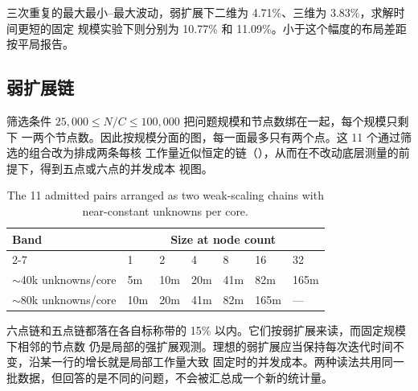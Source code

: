 \documentclass[11pt,a4paper,oneside]{report}
\let\OldSubsection\subsection
\renewcommand{\subsection}{\FloatBarrier\OldSubsection}
\begin{document}
三次重复的最大最小--最大波动，弱扩展下二维为 4.71\%、三维为 3.83\%，求解时间更短的固定
规模实验下则分别为 10.77\% 和 11.09\%。小于这个幅度的布局差距按平局报告。

\subsection{弱扩展链}
\label{sec:bands}
筛选条件 $25{,}000 \leq N/C \leq 100{,}000$ 把问题规模和节点数绑在一起，每个规模只剩下
一两个节点数。因此按规模分面的图，每一面最多只有两个点。这 11 个通过筛选的组合改为排成两条每核
工作量近似恒定的链（），从而在不改动底层测量的前提下，得到五点或六点的并发成本
视图。

\begin{table}[htbp]
  \centering
  \caption{The 11 admitted pairs arranged as two weak-scaling chains with near-constant
  unknowns per core.}
  \label{tab:bands}
  \begin{tabular}{lllllll}
    \toprule
    Band & \multicolumn{6}{c}{Size at node count} \\
    \cmidrule(lr){2-7}
         & 1 & 2 & 4 & 8 & 16 & 32 \\
    \midrule
    $\sim$40k unknowns/core & 5m & 10m & 20m & 41m & 82m & 165m \\
    $\sim$80k unknowns/core & 10m & 20m & 41m & 82m & 165m & --- \\
    \bottomrule
  \end{tabular}
\end{table}

六点链和五点链都落在各自标称带的 15\% 以内。它们按弱扩展来读，而固定规模下相邻的节点数
仍是局部的强扩展观测。理想的弱扩展应当保持每次迭代时间不变，沿某一行的增长就是局部工作量大致
固定时的并发成本。两种读法共用同一批数据，但回答的是不同的问题，不会被汇总成一个新的统计量。
\end{document}
